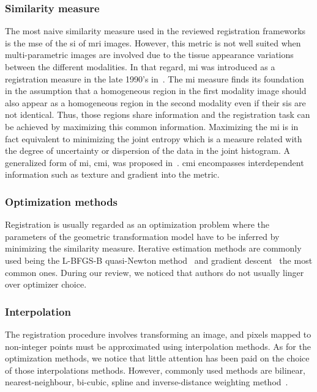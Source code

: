 \subsubsection{Similarity measure}\label{subsubsec:simmea}

The most naive similarity measure used in the reviewed registration frameworks is the \acf{mse} of the \ac{si} of \ac{mri} images. However, this metric is not well suited when multi-parametric images are involved due to the tissue appearance variations between the different modalities.
In that regard, \ac{mi} was introduced as a registration measure in the late 1990's in~\cite{Pluim2003}. The \ac{mi} measure finds its foundation in the assumption that a homogeneous region in the first modality image should also appear as a homogeneous region in the second modality even if their \acp{si} are not identical. Thus, those regions share information and the registration task can be achieved by maximizing this common information. Maximizing the \ac{mi} is in fact equivalent to minimizing the joint entropy which is a measure related with the degree of uncertainty or dispersion of the data in the joint histogram. A generalized form of \ac{mi}, \ac{cmi}, was proposed in~\cite{Chappelow2011}. \ac{cmi} encompasses interdependent information such as texture and gradient into the metric.

\subsubsection{Optimization methods}\label{subsubsec:optmea}

Registration is usually regarded as an optimization problem where the parameters of the geometric transformation model have to be inferred by minimizing the similarity measure. Iterative estimation methods are commonly used being the L-BFGS-B quasi-Newton method~\cite{Byrd1995} and gradient descent~\cite{Viola1997} the most common ones. During our review, we noticed that authors do not usually linger over optimizer choice.

\subsubsection{Interpolation}\label{subsubsec:int}

The registration procedure involves transforming an image, and pixels mapped to non-integer points must be approximated using interpolation methods. As for the optimization methods, we notice that little attention has been paid on the choice of those interpolations methods. However, commonly used methods are bilinear, nearest-neighbour, bi-cubic, spline and inverse-distance weighting method~\cite{Mitra2012}.

